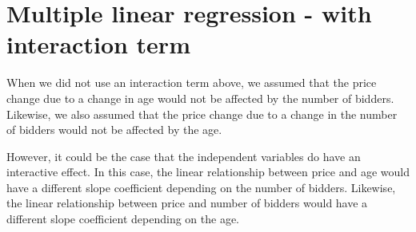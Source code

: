 \documentclass{article}\usepackage[]{graphicx}\usepackage[]{color}
\begin{document}
\newpage

\section{Multiple linear regression - with interaction term}

When we did not use an interaction term above, we assumed that the price change due to a change in age would not be affected by the number of bidders. Likewise, we also assumed that the price change due to a change in the number of bidders would not be affected by the age.

\vspace{5mm}


\vspace{5mm}

\noindent However, it could be the case that the independent variables do have an interactive effect. In this case, the linear relationship between price and age would have a different slope coefficient depending on the number of bidders. Likewise, the linear relationship between price and number of bidders would have a different slope coefficient depending on the age.

\vspace{5mm}

\end{document}
